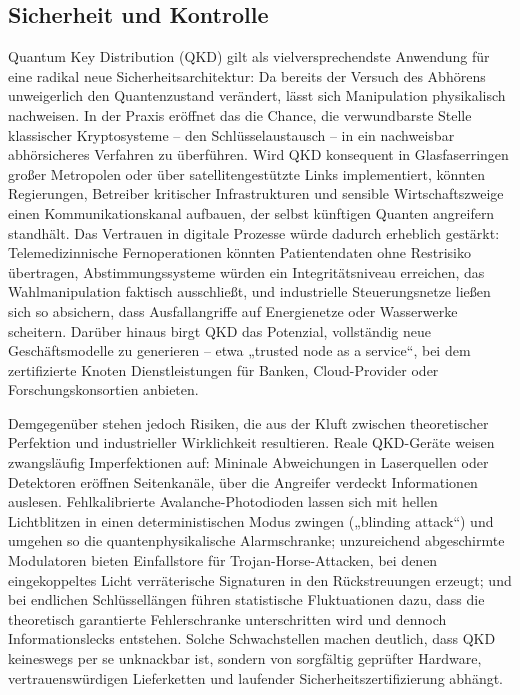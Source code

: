 \subsection{Sicherheit und Kontrolle}
Quantum Key Distribution (QKD) gilt als vielversprechendste Anwendung für eine radikal neue Sicherheitsarchitektur: Da bereits der Versuch des Abhörens unweigerlich den Quantenzustand verändert, lässt sich Manipulation physikalisch nachweisen. In der Praxis eröffnet das die Chance, die verwundbarste Stelle klassischer Kryptosysteme – den Schlüsselaustausch – in ein nachweisbar abhörsicheres Verfahren zu überführen. Wird QKD konsequent in Glasfaserringen großer Metropolen oder über satellitengestützte Links implementiert, könnten Regierungen, Betreiber kritischer Infrastrukturen und sensible Wirtschaftszweige einen Kommunikationskanal aufbauen, der selbst künftigen Quanten angreifern standhält. Das Vertrauen in digitale Prozesse würde dadurch erheblich gestärkt: Telemedizinnische Fernoperationen könnten Patientendaten ohne Restrisiko übertragen, Abstimmungssysteme würden ein Integritätsniveau erreichen, das Wahlmanipulation faktisch ausschließt, und industrielle Steuerungsnetze ließen sich so absichern, dass Ausfallangriffe auf Energienetze oder Wasserwerke scheitern. Darüber hinaus birgt QKD das Potenzial, vollständig neue Geschäftsmodelle zu generieren – etwa „trusted node as a service“, bei dem zertifizierte Knoten Dienstleistungen für Banken, Cloud-Provider oder Forschungskonsortien anbieten.

Demgegenüber stehen jedoch Risiken, die aus der Kluft zwischen theoretischer Perfektion und industrieller Wirklichkeit resultieren. Reale QKD-Geräte weisen zwangsläufig Imperfektionen auf: Mininale Abweichungen in Laserquellen oder Detektoren eröffnen Seitenkanäle, über die Angreifer verdeckt Informationen auslesen. Fehlkalibrierte Avalanche-Photodioden lassen sich mit hellen Lichtblitzen in einen deterministischen Modus zwingen („blinding attack“) und umgehen so die quantenphysikalische Alarmschranke; unzureichend abgeschirmte Modulatoren bieten Einfallstore für Trojan-Horse-Attacken, bei denen eingekoppeltes Licht verräterische Signaturen in den Rückstreuungen erzeugt; und bei endlichen Schlüssellängen führen statistische Fluktuationen dazu, dass die theoretisch garantierte Fehlerschranke unterschritten wird und dennoch Informationslecks entstehen. Solche Schwachstellen machen deutlich, dass QKD keineswegs per se unknackbar ist, sondern von sorgfältig geprüfter Hardware, vertrauenswürdigen Lieferketten und laufender Sicherheitszertifizierung abhängt.

